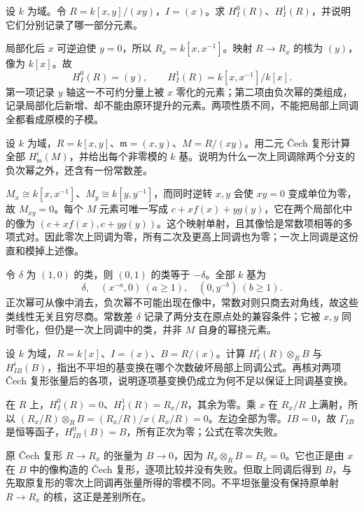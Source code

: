 \begin{optionalexercise}\label{b3:ex:22-principal-nonreduced}
	设 \(k\) 为域。令 \(R=k[x,y]/(xy)\)，\(I=(x)\)。求 \(H_I^0(R)\)、\(H_I^1(R)\)，并说明它们分别记录了哪一部分元素。
\end{optionalexercise}
\begin{solution}
	局部化后 \(x\) 可逆迫使 \(y=0\)，所以 \(R_x=k[x,x^{-1}]\)。映射 \(R\to R_x\) 的核为 \((y)\)，像为 \(k[x]\)。故
	\[
		H_I^0(R)=(y),\qquad H_I^1(R)=k[x,x^{-1}]/k[x].
	\]
	第一项记录 \(y\) 轴这一不可约分量上被 \(x\) 零化的元素；第二项由负次幂的类组成，记录局部化后新增、却不能由原环提升的元素。两项性质不同，不能把局部上同调全都看成原模的子模。
\end{solution}

\begin{optionalexercise}\label{b3:ex:22-two-variable-cech}
	设 \(k\) 为域，\(R=k[x,y]\)、\(\mathfrak m=(x,y)\)、\(M=R/(xy)\)。用二元 Čech 复形计算全部 \(H_{\mathfrak m}^i(M)\)，并给出每个非零模的 \(k\) 基。说明为什么一次上同调除两个分支的负次幂之外，还含有一份常数差。
\end{optionalexercise}
\begin{solution}
	\(M_x\cong k[x,x^{-1}]\)、\(M_y\cong k[y,y^{-1}]\)，而同时逆转 \(x,y\) 会使 \(xy=0\) 变成单位为零，故 \(M_{xy}=0\)。每个 \(M\) 元素可唯一写成 \(c+xf(x)+yg(y)\)，它在两个局部化中的像为 \((c+xf(x),c+yg(y))\)。这个映射单射，且其像恰是常数项相等的多项式对。因此零次上同调为零，所有二次及更高上同调也为零；一次上同调是这份直和模掉上述像。

	令 \(\delta\) 为 \((1,0)\) 的类，则 \((0,1)\) 的类等于 \(-\delta\)。全部 \(k\) 基为
	\[
		\delta,\quad (x^{-a},0)\ (a\ge1),\quad(0,y^{-b})\ (b\ge1).
	\]
	正次幂可从像中消去，负次幂不可能出现在像中，常数对则只商去对角线，故这些类线性无关且穷尽商。常数差 \(\delta\) 记录了两分支在原点处的兼容条件；它被 \(x,y\) 同时零化，但仍是一次上同调中的类，并非 \(M\) 自身的幂挠元素。
\end{solution}

\begin{optionalexercise}\label{b3:ex:22-flat-base-change}
	设 \(k\) 为域，\(R=k[x]\)、\(I=(x)\)、\(B=R/(x)\)。计算 \(H_I^i(R)\otimes_RB\) 与 \(H_{IB}^i(B)\)，指出不平坦的基变换在哪个次数破坏局部上同调公式。再核对两项 Čech 复形张量后的各项，说明逐项基变换仍成立为何不足以保证上同调基变换。
\end{optionalexercise}
\begin{solution}
	在 \(R\) 上，\(H_I^0(R)=0\)、\(H_I^1(R)=R_x/R\)，其余为零。乘 \(x\) 在 \(R_x/R\) 上满射，所以 \((R_x/R)\otimes_RB=(R_x/R)/x(R_x/R)=0\)。左边全部为零。\(IB=0\)，故 \(\Gamma_{IB}\) 是恒等函子，\(H_{IB}^0(B)=B\)，所有正次为零；公式在零次失败。

	原 Čech 复形 \(R\to R_x\) 的张量为 \(B\to0\)，因为 \(R_x\otimes_RB=B_x=0\)。它也正是由 \(x\) 在 \(B\) 中的像构造的 Čech 复形，逐项比较并没有失败。但取上同调后得到 \(B\)，与先取原复形的零次上同调再张量所得的零模不同。不平坦张量没有保持原单射 \(R\to R_x\) 的核，这正是差别所在。
\end{solution}

